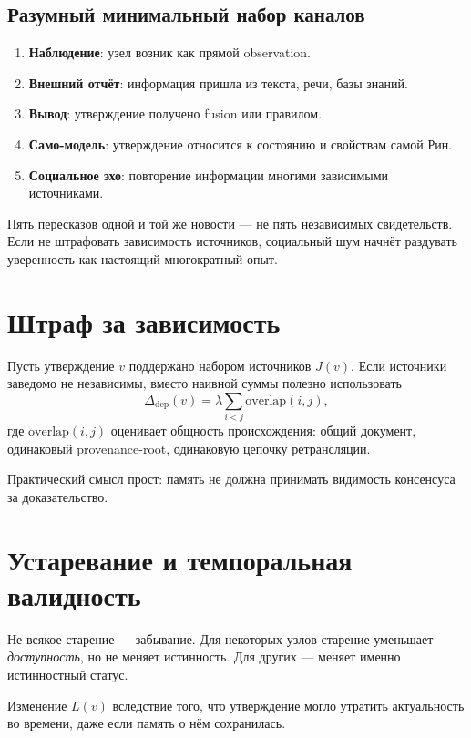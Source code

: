 \subsection*{Разумный минимальный набор каналов}
\begin{enumerate}
\item \textbf{Наблюдение}: узел возник как прямой observation.
\item \textbf{Внешний отчёт}: информация пришла из текста, речи, базы знаний.
\item \textbf{Вывод}: утверждение получено fusion или правилом.
\item \textbf{Само-модель}: утверждение относится к состоянию и свойствам самой Рин.
\item \textbf{Социальное эхо}: повторение информации многими зависимыми источниками.
\end{enumerate}

\begin{pitfall}
Пять пересказов одной и той же новости — не пять независимых свидетельств. Если не
штрафовать зависимость источников, социальный шум начнёт раздувать уверенность как
настоящий многократный опыт.
\end{pitfall}

\section{Штраф за зависимость}

Пусть утверждение $v$ поддержано набором источников $J(v)$. Если источники заведомо
не независимы, вместо наивной суммы полезно использовать
\[
\Delta_{\mathrm{dep}}(v)=
\lambda \sum_{i<j}\mathrm{overlap}(i,j),
\]
где $\mathrm{overlap}(i,j)$ оценивает общность происхождения: общий документ,
одинаковый provenance-root, одинаковую цепочку ретрансляции.

Практический смысл прост: память не должна принимать видимость консенсуса за
доказательство.

\section{Устаревание и темпоральная валидность}

Не всякое старение — забывание. Для некоторых узлов старение уменьшает \emph{доступность},
но не меняет истинность. Для других — меняет именно истинностный статус.

\begin{definition}
Изменение $L(v)$ вследствие того, что утверждение могло утратить актуальность во
времени, даже если память о нём сохранилась.
\end{definition}

